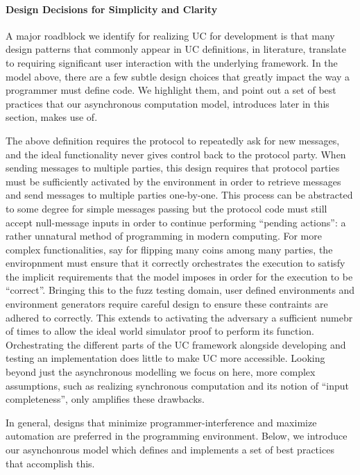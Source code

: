\paragraph{Design Decisions for Simplicity and Clarity}
A major roadblock we identify for realizing UC for development is that many design patterns that commonly appear in UC definitions, in literature, translate to requiring significant user interaction with the underlying framework.
In the model above, there are a few subtle design choices that greatly impact the way a programmer must define code. 
We highlight them, and point out a set of best practices that our asynchronous computation model, introduces later in this section, makes use of.

The above definition requires the protocol to repeatedly ask for new messages, and the ideal functionality never gives control back to the protocol party. 
When sending messages to multiple parties, this design requires that protocol parties must be sufficiently activated by the environment in order to retrieve messages and send messages to multiple parties one-by-one. 
This process can be abstracted to some degree for simple messages passing but the protocol code must still accept null-message inputs in order to continue performing ``pending actions'': a rather unnatural method of programming in modern computing. 
For more complex functionalities, say for flipping many coins among many parties, the enviropnment must ensure that it correctly orchestrates the execution to satisfy the implicit requirements that the model imposes in order for the execution to be ``correct''. 
Bringing this to the fuzz testing domain, user defined environments and environment generators require careful design to ensure these contraints are adhered to correctly.
This extends to activating the adversary a sufficient numebr of times to allow the ideal world simulator proof to perform its function.
Orchestrating the different parts of the UC framework alongside developing and testing an implementation does little to make UC more accessible. 
Looking beyond just the asynchronous modelling we focus on here, more complex assumptions, such as realizing synchronous computation and its notion of ``input completeness'', only amplifies these drawbacks.

In general, designs that minimize programmer-interference and maximize automation are preferred in the programming environment. 
Below, we introduce our asynchonrous model which defines and implements a set of best practices that accomplish this.

